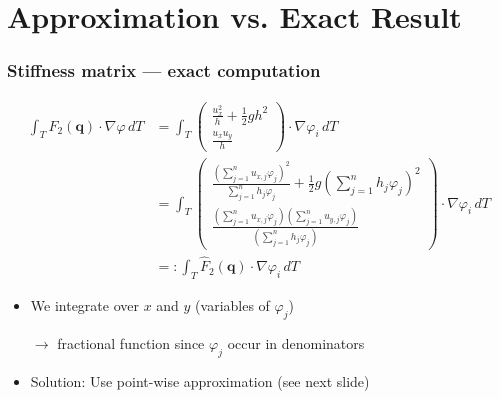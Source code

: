 \documentclass{beamer}
\renewcommand{\phi}{\varphi}
\begin{document}
\section{Approximation vs. Exact Result}
\label{sec:stiffness-exact-approx}

\begin{frame}
  \frametitle{Stiffness matrix --- exact computation}
  \begin{align*}
    \int_T F_2(\mathbf{q}) \cdot \nabla \phi \, dT & = 
    \int_T
    \begin{pmatrix}
      \frac{u_x^2}{h} + \frac{1}{2} g h^2 \\ \frac{u_x u_y}{h}
    \end{pmatrix}
    \cdot \nabla \phi_i \, dT \\
    & =
    \int_T
    \begin{pmatrix}
      \frac{\left(\sum_{j=1}^n u_{x,j} \phi_j \right)^2}{\sum_{j=1}^n h_j \phi_j} + \frac{1}{2} g \left( \sum_{j=1}^n h_j \phi_j \right)^2 \\ \frac{\left( \sum_{j=1}^n u_{x,j} \phi_j \right) \left( \sum_{j=1}^n u_{y,j} \phi_j \right)}{\left( \sum_{j=1}^n h_{j} \phi_j \right)}
    \end{pmatrix}
    \cdot \nabla \phi_i \, dT \\
    & =: \int_T \widehat{F}_2(\mathbf{q}) \cdot \nabla \phi_i \,dT
  \end{align*}
  \begin{itemize}
  \item We integrate over $x$ and $y$ (variables of $\phi_j$)

    $\rightarrow$ fractional function since $\phi_j$ occur in denominators
  \item Solution: Use point-wise approximation (see next slide)
  \end{itemize}
\end{frame}
\end{document}
